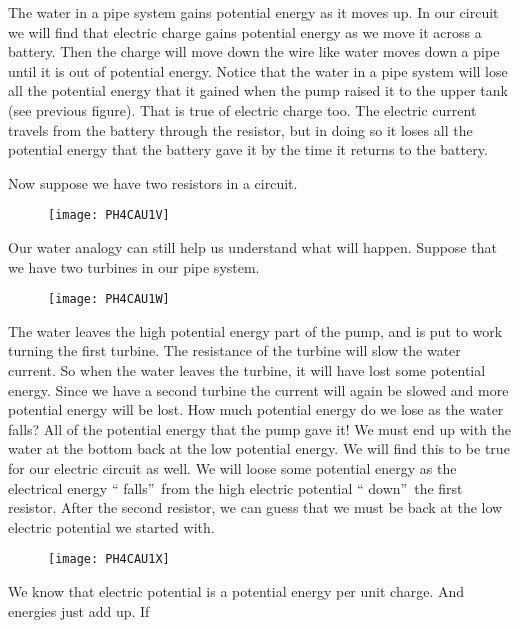 The water in a pipe system gains potential energy as it moves up. In our circuit we will find that electric charge gains potential energy as we move it across a battery. Then the charge will move down the wire like water moves down a pipe until it is out
of potential energy. Notice that the water in a pipe system will lose all the potential energy that it gained when the pump raised it to the upper tank (see previous figure). That is true of electric charge too. The electric current travels from the battery through the resistor, but in doing so it loses all the potential energy that the battery gave it by the time it returns to the battery.

Now suppose we have two resistors in a circuit.

\begin{figure}[h!]
	\centering
	\texttt{[image: PH4CAU1V]}
\end{figure}

Our water analogy can still help us understand what will happen. Suppose
that we have two turbines in our pipe system. 

\begin{figure}[h!]
	\centering
	\texttt{[image: PH4CAU1W]}
\end{figure}

The water leaves the high potential energy part of the pump, and is put to work turning the first turbine. The resistance of the turbine will slow the water current. So when the water leaves the turbine, it will have lost some potential energy. Since
we have a second turbine the current will again be slowed and more potential
energy will be lost. How much potential energy do we lose as the water
falls? All of the potential energy that the pump gave it! We must end up
with the water at the bottom back at the low potential energy. We will find
this to be true for our electric circuit as well. We will loose some
potential energy as the electrical energy \textquotedblleft
falls\textquotedblright\ from the high electric potential \textquotedblleft
down\textquotedblright\ the first resistor. After the second resistor, we
can guess that we must be back at the low electric potential we started with.

\begin{figure}[h!]
	\centering
	\texttt{[image: PH4CAU1X]}
\end{figure}

We know that electric potential is a potential energy per unit charge. And energies just add up. If 

